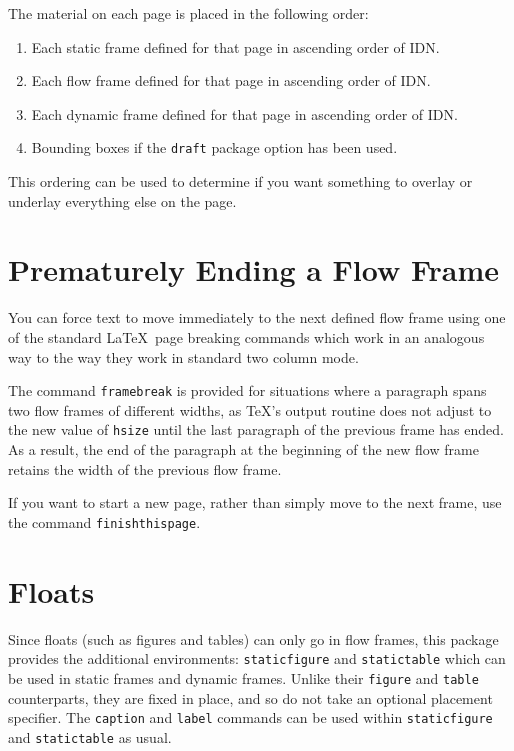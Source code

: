 \documentclass[a4paper]{report}
\providecommand{\env}[1]{\texttt{#1}}
\providecommand{\cmdname}[1]{\texttt{\symbol{92}#1}}
\begin{document}
The material on each page is placed in the following order:
\begin{enumerate}
\item Each static frame defined for that page in ascending
order of IDN.

\item Each flow frame defined for that page in ascending
order of IDN.

\item Each dynamic frame defined for that page in ascending
order of IDN.

\item {Bounding boxes} if the \texttt{draft}
package option has been used.
\end{enumerate}

This ordering can be used to determine if you want something
to overlay or underlay everything else on the page. 

\section*{Prematurely Ending a Flow Frame}

You can force text to move immediately to the next defined
flow frame using one of the standard \LaTeX\ page breaking commands
which  work in an analogous way to the way they
work in standard two column mode. 

The command \cmdname{framebreak} is provided for situations
where a paragraph spans two flow frames
of different widths, as \TeX's output routine does not 
adjust to the new value of \cmdname{hsize} until the last 
paragraph of the previous frame has ended. As a 
result, the end of the paragraph at the beginning of the new
flow frame retains the width of the previous flow frame.

If you want to start a new page, rather than simply move to the 
next frame, use the command\newline
\cmdname{finishthispage}.

\section*{Floats}

Since floats (such as figures and tables) can only go in 
{flow frames}, this package provides
the additional environments: 
\env{staticfigure} and  
\env{statictable} which can be used in static frames
and dynamic frames. Unlike their \env{figure} and
\env{table} counterparts, they are fixed in place, and
so do not take an optional placement specifier. The 
\cmdname{caption} and \cmdname{label} commands can 
be used within \env{staticfigure} and \env{statictable} as
usual.
\end{document}
